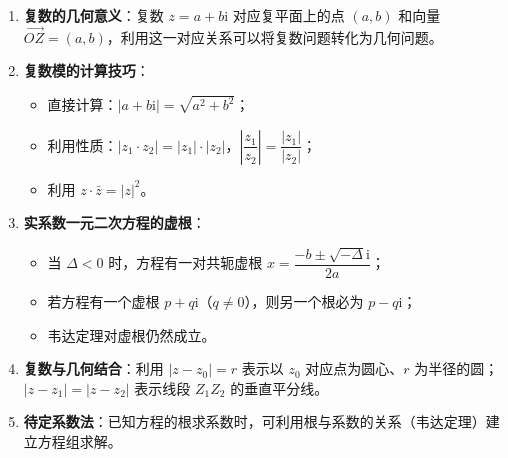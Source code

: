 \documentclass[11pt]{ctexrep}
\begin{document}
\begin{enumerate}
    \item \textbf{复数的几何意义}：复数 $z = a + b\mathrm{i}$ 对应复平面上的点 $(a, b)$ 和向量 $\overrightarrow{OZ} = (a, b)$，利用这一对应关系可以将复数问题转化为几何问题。
    
    \item \textbf{复数模的计算技巧}：
    \begin{itemize}
        \item 直接计算：$|a + b\mathrm{i}| = \sqrt{a^2 + b^2}$；
        \item 利用性质：$|z_1 \cdot z_2| = |z_1| \cdot |z_2|$，$\left|\dfrac{z_1}{z_2}\right| = \dfrac{|z_1|}{|z_2|}$；
        \item 利用 $z \cdot \bar{z} = |z|^2$。
    \end{itemize}
    
    \item \textbf{实系数一元二次方程的虚根}：
    \begin{itemize}
        \item 当 $\Delta < 0$ 时，方程有一对共轭虚根 $x = \dfrac{-b \pm \sqrt{-\Delta}\mathrm{i}}{2a}$；
        \item 若方程有一个虚根 $p + q\mathrm{i}$（$q \neq 0$），则另一个根必为 $p - q\mathrm{i}$；
        \item 韦达定理对虚根仍然成立。
    \end{itemize}
    
    \item \textbf{复数与几何结合}：利用 $|z - z_0| = r$ 表示以 $z_0$ 对应点为圆心、$r$ 为半径的圆；$|z - z_1| = |z - z_2|$ 表示线段 $Z_1Z_2$ 的垂直平分线。
    
    \item \textbf{待定系数法}：已知方程的根求系数时，可利用根与系数的关系（韦达定理）建立方程组求解。
\end{enumerate}
\end{document}
